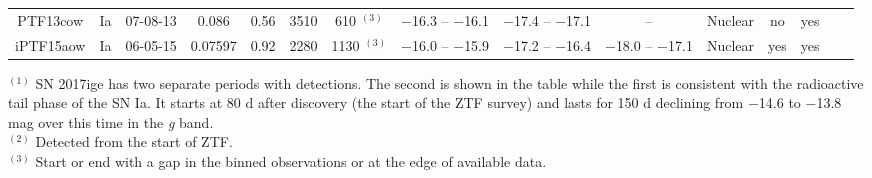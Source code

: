 \documentclass[a4paper,oneside,12pt, class=Latex/Classes/PhDthesisPSnPDF, crop=false]{standalone}
\begin{document}
\begin{table}
{\begin{tabular}{ccccc|cccccccccc}
        PTF13cow & Ia & 07-08-13 & 0.086 & 0.56 & 3510 & 610 $^{(3)}$ & $-$16.3 -- $-$16.1 & $-$17.4 -- $-$17.1 & -- & Nuclear& no & yes \\
        iPTF15aow & Ia & 06-05-15 & 0.07597 & 0.92 & 2280 & 1130 $^{(3)}$ & $-$16.0 -- $-$15.9 & $-$17.2 -- $-$16.4 & $-$18.0 -- $-$17.1 & Nuclear& yes & yes \\
        \hline
    \end{tabular}
    }
    \label{weirdos}
    \begin{flushleft}
        $^{(1)}$ SN 2017ige has two separate periods with detections. The second is shown in the table while the first is consistent with the radioactive tail phase of the SN Ia. It starts at 80 d after discovery (the start of the ZTF survey) and lasts for 150 d declining from $-$14.6 to $-$13.8 mag over this time in the \textit{g} band. \\
        $^{(2)}$ Detected from the start of ZTF.\\
        $^{(3)}$ Start or end with a gap in the binned observations or at the edge of available data.\\
    \end{flushleft}
\end{table}
\end{document}
